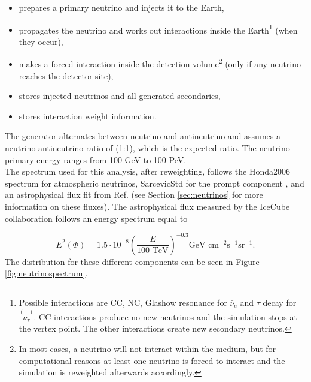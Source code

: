 \newcommand\barparen[1]{\overset{(-)}{#1}}
\vspace{2mm}
\begin{itemize}
\item prepares a primary neutrino and injects it to the Earth,
\item propagates the neutrino and works out interactions inside the Earth\footnote{Possible interactions are CC, NC, Glashow resonance for $\bar{\nu}_e$ and $\tau$ decay for $\barparen{\nu_\tau}$. CC interactions produce no new neutrinos and the simulation stops at the vertex point. The other interactions create new secondary neutrinos.} (when they occur),
\item makes a forced interaction inside the detection volume\footnote{
In most cases, a neutrino will not interact within the medium, but for computational reasons at least one neutrino is forced to interact and the simulation is reweighted afterwards accordingly.} (only if any neutrino reaches the detector site),
\item stores injected neutrinos and all generated secondaries,
\item stores interaction weight information.
\end{itemize}
\vspace{3mm}
\noindent The generator alternates between neutrino and antineutrino and assumes a neutrino-antineutrino ratio of (1:1), which is the expected ratio. The neutrino primary energy ranges from 100 GeV to 100 PeV.\\

\noindent The spectrum used for this analysis, after reweighting, follows the Honda2006 spectrum \cite{Honda:2006qj} for atmospheric neutrinos, SarcevicStd for the prompt component \cite{Enberg:2008te}, and an astrophysical flux fit from Ref. \cite{Aartsen:2014gkd} (see Section \ref{sec:neutrinos} for more information on these fluxes). The astrophysical flux measured by the IceCube collaboration follows an energy spectrum equal to

\begin{equation}
E^2 \left(\Phi \right) = 1.5 \cdot 10^{-8} \left( \frac{E}{100 \textrm{ TeV}} \right)^{-0.3} \textrm{GeV } \textrm{cm}^{-2} \textrm{s}^{-1} \textrm{sr}^{-1}.
\end{equation}
\vspace{3mm}
\noindent The distribution for these different components can be seen in Figure \ref{fig:neutrinospectrum}.

